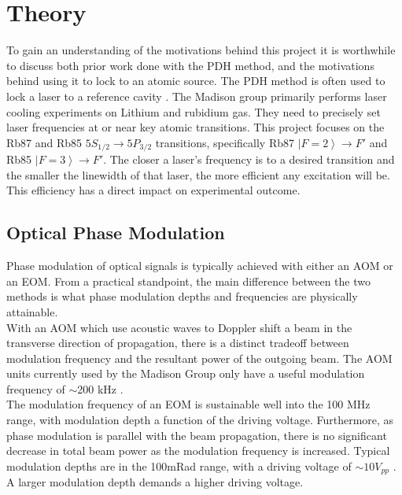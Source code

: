 \newpage
\section{Theory}
\label{sec:theory}

To gain an understanding of the motivations behind this project it is worthwhile to discuss both prior work done with the PDH method, and the motivations behind using it to lock to an atomic source.  The PDH method is often used to lock a laser to a reference cavity \cite{black1998}.  The Madison group primarily performs laser cooling experiments on Lithium and rubidium gas.  They need to precisely set laser frequencies at or near key atomic transitions. This project focuses on the Rb87 and Rb85 $5S_{1/2} \rightarrow 5P_{3/2}$ transitions, specifically Rb87 $\left|F=2\right\rangle \rightarrow F'$ and Rb85 $\left|F=3\right\rangle \rightarrow F'$.  The closer a laser's frequency is to a desired transition and the smaller the linewidth of that laser, the more efficient any excitation will be.  This efficiency has a direct impact on experimental outcome.


\subsection{Optical Phase Modulation}

Phase modulation of optical signals is typically achieved with either an AOM or an EOM. From a practical standpoint, the main difference between the two methods is what phase modulation depths and frequencies are physically attainable. \\

With an AOM which use acoustic waves to Doppler shift a beam in the transverse direction of propagation, there is a distinct tradeoff between modulation frequency and the resultant power of the outgoing beam.  The AOM units currently used by the Madison Group only have a useful modulation frequency of $\sim$200 kHz \cite{madison14}. \\

The modulation frequency of an EOM is sustainable well into the 100 MHz range, with modulation depth a function of the driving voltage. Furthermore, as phase modulation is parallel with the beam propagation, there is no significant decrease in total beam power as the modulation frequency is increased. Typical modulation depths are in the 100mRad range, with a driving voltage of $\sim 10 V_{pp}$ \cite{thorlabs_eom}. A larger modulation depth demands a higher driving voltage. \\

